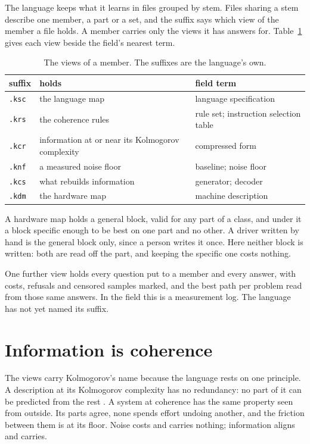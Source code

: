 The language keeps what it learns in files grouped by stem. Files sharing a stem describe one
member, a part or a set, and the suffix says which view of the member a file holds. A member
carries only the views it has answers for. Table~\ref{tab:kfiles} gives each view beside the
field's nearest term.

\begin{table}[h]
\centering
\small
\begin{tabular}{@{}l l l@{}}
\toprule
suffix & holds & field term \\
\midrule
\texttt{.ksc} & the language map & language specification \\
\texttt{.krs} & the coherence rules & rule set; instruction selection table \\
\texttt{.kcr} & information at or near its Kolmogorov complexity & compressed form \\
\texttt{.knf} & a measured noise floor & baseline; noise floor \\
\texttt{.kcs} & what rebuilds information & generator; decoder \\
\texttt{.kdm} & the hardware map & machine description \\
\bottomrule
\end{tabular}
\caption{The views of a member. The suffixes are the language's own.}
\label{tab:kfiles}
\end{table}

A hardware map holds a general block, valid for any part of a class, and under it a block
specific enough to be best on one part and no other. A driver written by hand is the general
block only, since a person writes it once. Here neither block is written: both are read off the
part, and keeping the specific one costs nothing.

One further view holds every question put to a member and every answer, with costs, refusals and
censored samples marked, and the best path per problem read from those same answers. In the
field this is a measurement log. The language has not yet named its suffix.

\section{Information is coherence}

The views carry Kolmogorov's name because the language rests on one principle. A description at
its Kolmogorov complexity has no redundancy: no part of it can be predicted from the rest
\cite{src:Kolmogorov}. A system at coherence has the same property seen from outside. Its parts
agree, none spends effort undoing another, and the friction between them is at its floor. Noise
costs and carries nothing; information aligns and carries.

